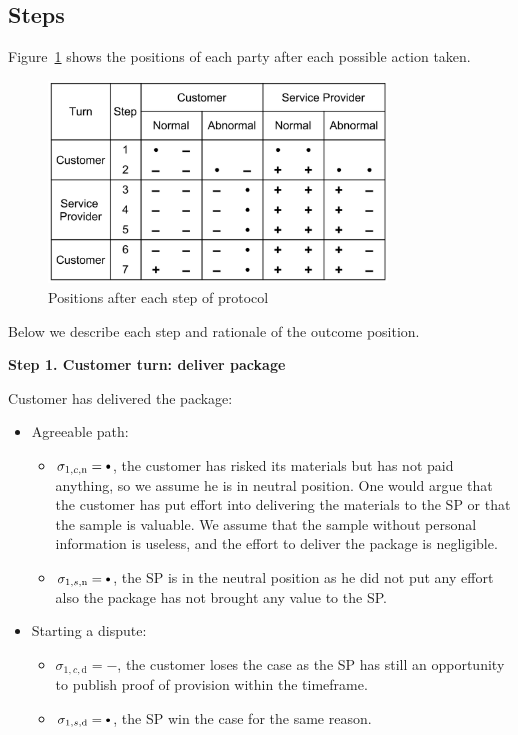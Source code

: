 \documentclass{ieeeaccess}
\newcommand\sbullet[1][.75]{\mathbin{\ThisStyle{\vcenter{\hbox{%
  \scalebox{#1}{$\SavedStyle\bullet$}}}}}%
}
\begin{document}
\subsection{Steps}\label{steps}

Figure~\ref{fig:positions} 
shows the positions of each party after each possible action taken.

\begin{figure}[h!]
\includegraphics[width=9cm]{formal-table-of-positions.png}
\centering
\caption{Positions after each step of protocol}
\label{fig:positions}
\end{figure}


Below we describe each step and rationale of the outcome position.


\noindent \textbf
{Step 1. Customer turn: deliver package}\label{step-1-deliver-package}

Customer has delivered the package:

\begin{itemize}
\item
  Agreeable path:

  \begin{itemize}
  
  \item
    \(\sigma_{1, c, \mathrm{n}} = \sbullet\), the customer has risked its
    materials but has not paid anything, so we assume he is in neutral
    position. One would argue that the customer has put effort into
    delivering the materials to the SP or that the sample is valuable.
    We assume that the sample without personal information is useless, and the effort to deliver the package is negligible.
  \item
    \(\sigma_{1, s, \mathrm{n}} = \sbullet\), the SP is in the neutral position as he did not put any effort also the package has not brought any value to the SP.
  \end{itemize}
\item
  Starting a dispute:

  \begin{itemize}
  
  \item
    \(\sigma_{1, c, \mathrm{d}} = -\), the customer loses the case as the SP has still an opportunity to publish proof of provision within the timeframe.
  \item
    \(\sigma_{1, s, \mathrm{d}} = \sbullet\), the SP win the case for the same reason.
  \end{itemize}
\end{itemize}
\end{document}
